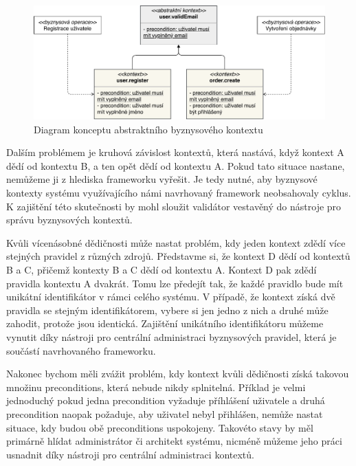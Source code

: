 \begin{figure}
    \centering
    \includegraphics[keepaspectratio=true, width=1\linewidth]{figures/abstract-context.pdf}
    \caption{Diagram konceptu abstraktního byznysového kontextu}
    \label{fig:abstract-context}
\end{figure}

Dalším problémem je kruhová závislost kontextů, která nastává, když kontext A dědí od kontextu B,
a ten opět dědí od kontextu A. Pokud tato situace nastane, nemůžeme ji z hlediska frameworku vyřešit.
Je tedy nutné, aby byznysové kontexty systému využívajícího námi navrhovaný framework neobsahovaly cyklus.
K zajištění této skutečnosti by mohl sloužit validátor vestavěný do nástroje pro správu byznysových kontextů.

Kvůli vícenásobné dědičnosti může nastat problém, kdy jeden kontext zdědí více stejných pravidel z
různých zdrojů. Představme si, že kontext D dědí od kontextů B a C, přičemž kontexty B a C dědí
od kontextu A. Kontext D pak zdědí pravidla kontextu A dvakrát. Tomu lze předejít tak, že
každé pravidlo bude mít unikátní identifikátor v rámci celého systému. V případě, že kontext
získá dvě pravidla se stejným identifikátorem, vybere si jen jedno z nich a druhé může zahodit, protože
jsou identická. Zajištění unikátního identifikátoru můžeme vynutit díky nástroji pro centrální
administraci byznysových pravidel, která je součástí navrhovaného frameworku.

Nakonec bychom měli zvážit problém, kdy kontext kvůli dědičnosti získá takovou množinu
preconditions, která nebude nikdy splnitelná. Příklad je velmi jednoduchý \textendash\xspace
pokud jedna precondition vyžaduje příhlášení uživatele a druhá precondition naopak požaduje,
aby uživatel nebyl přihlášen, nemůže nastat situace, kdy budou obě preconditions uspokojeny.
Takovéto stavy by měl primárně hlídat administrátor či architekt systému, nicméně můžeme
jeho práci usnadnit díky nástroji pro centrální administraci kontextů.


